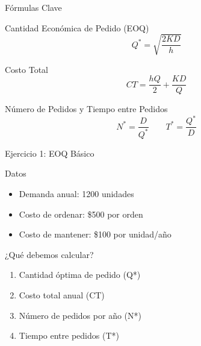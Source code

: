 \documentclass{beamer}
\begin{document}
\begin{frame}{Fórmulas Clave}
    \begin{alertblock}{Cantidad Económica de Pedido (EOQ)}
        \vspace{0.2cm}
        \[ Q^* = \sqrt{\frac{2KD}{h}} \]
    \end{alertblock}
    \pause
    \begin{block}{Costo Total}
        \vspace{0.2cm}
        \[ CT = \frac{hQ}{2} + \frac{KD}{Q} \]
    \end{block}
    \pause
    \begin{block}{Número de Pedidos y Tiempo entre Pedidos}
        \vspace{0.2cm}
        \[ N^* = \frac{D}{Q^*} \qquad T^* = \frac{Q^*}{D} \]
    \end{block}
\end{frame}

\begin{frame}{Ejercicio 1: EOQ Básico}
    \begin{block}{Datos}
        \begin{itemize}
            \item Demanda anual: 1200 unidades
            \item Costo de ordenar: \$500 por orden
            \item Costo de mantener: \$100 por unidad/año
        \end{itemize}
    \end{block}
    \pause
    \begin{alertblock}{¿Qué debemos calcular?}
        \begin{enumerate}
            \item Cantidad óptima de pedido (Q*)
            \item Costo total anual (CT)
            \item Número de pedidos por año (N*)
            \item Tiempo entre pedidos (T*)
        \end{enumerate}
    \end{alertblock}
\end{frame}
\end{document}
